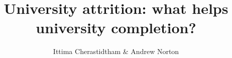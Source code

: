 \documentclass{grattan}
\author{Ittima Cherastidtham \& Andrew Norton}
\title{University attrition: what helps university completion?}
\begin{document}
\null
\end{document}
